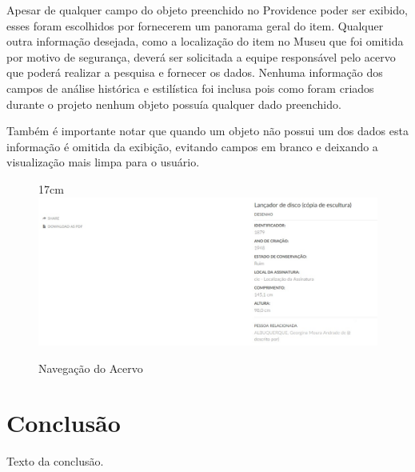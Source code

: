 \documentclass[a4paper,12pt,oneside,onecolumn,final,fleqn]{repUERJ}
\begin{document}
Apesar de qualquer campo do objeto preenchido no Providence poder ser exibido, esses foram escolhidos por fornecerem um panorama geral do item. Qualquer outra informação desejada, como a localização do item no Museu que foi omitida por motivo de segurança, deverá ser solicitada a equipe responsável pelo acervo que poderá realizar a pesquisa e fornecer os dados. Nenhuma informação dos campos de análise histórica e estilística foi inclusa pois como foram criados durante o projeto nenhum objeto possuía qualquer dado preenchido.

Também é importante notar que quando um objeto não possui um dos dados esta informação é omitida da exibição, evitando campos em branco e deixando a visualização mais limpa para o usuário.

\begin{figure}[!ht]{17cm}
	\includegraphics[width=15cm, center]{figuras/pawtucket_objeto.jpg}
	\caption{Navegação do Acervo} \label{fig:tela_obj}
\end{figure}

\chapter*{Conclusão}

Texto da conclusão.


\backmatter %

\end{document}
